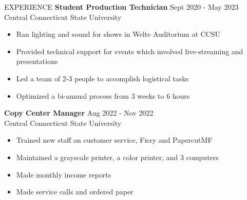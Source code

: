 \documentclass{resume}
\begin{document}
\begin{rSection}{EXPERIENCE}
	\textbf{Student Production Technician} \hfill {Sept 2020 - May 2023}\\ %
	Central Connecticut State University
	\begin{itemize}
		\setlength{\itemsep}{-3pt}
		\item Ran lighting and sound for shows in Welte Auditorium at CCSU
		\item Provided technical support for events which involved live-streaming and presentations
		\item Led a team of 2-3 people to accomplish logistical tasks
		\item Optimized a bi-annual process from 3 weeks to 6 hours
	\end{itemize}
	
	\textbf{Copy Center Manager} \hfill {Aug 2022 - Nov 2022}\\ %
	Central Connecticut State University
	\begin{itemize}
		\setlength{\itemsep}{-3pt}
		\item Trained new staff on customer service, Fiery and PapercutMF
		\item Maintained a grayscale printer, a color printer, and 3 computers
		\item Made monthly income reports
		\item Made service calls and ordered paper
	 \end{itemize}
\end{rSection}
\end{document}
